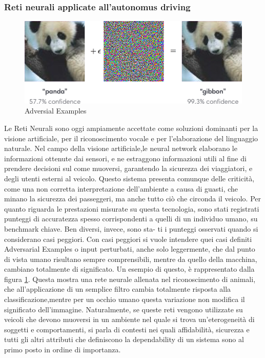 \documentclass[14pt]{extarticle}
\begin{document}
\subsubsection{Reti neurali applicate all'autonomus driving}
\begin{figure}
	\centering
	\includegraphics[scale=0.8]{adversarial_img.png}
	\caption{Adversial Examples}
	\label{fig:AdvExp}
	\end{figure}
Le Reti Neurali sono oggi ampiamente accettate come soluzioni dominanti per la visione artificiale, per il riconoscimento vocale e per l'elaborazione del linguaggio naturale. Nel campo della visione artificiale,le neural network elaborano le informazioni ottenute dai sensori, e ne estraggono informazioni utili al fine di prendere decisioni sul come muoversi, garantendo la sicurezza dei viaggiatori, e degli utenti esterni al veicolo. 
Questo sistema presenta comunque delle criticità, come una non corretta interpretazione dell'ambiente a causa di guasti, che minano la sicurezza dei passeggeri, ma anche tutto ciò che circonda il veicolo.%
Per quanto riguarda le prestazioni misurate su questa tecnologia, sono stati
registrati punteggi di accuratezza spesso corrispondenti a quelli di un
individuo umano, su benchmark chiave. Ben diversi, invece, sono sta-
ti i punteggi osservati quando si considerano  casi peggiori\cite{secci2020failures}. Con casi
peggiori si vuole intendere quei casi definiti Adversarial Examples \cite{engstrom2019exploring} o
input perturbati, anche solo leggermente, che dal punto di vista umano
risultano sempre comprensibili, mentre da quello della macchina, cambiano totalmente di significato. Un esempio di questo, è rappresentato dalla figura \ref{fig:AdvExp}. Questa mostra una rete neurale allenata nel riconoscimento di animali, che all'applicazione di un semplice filtro cambia totalmente risposta alla classificazione,mentre per un occhio umano questa variazione non modifica il significato dell'immagine.
Naturalmente, se queste reti vengono
utilizzate su veicoli che devono muoversi in un ambiente nel quale si
trova un'eterogeneità di soggetti e comportamenti, si parla di contesti
nei quali affidabilità, sicurezza e tutti gli altri attributi che definiscono la
dependability di un sistema sono al primo posto in ordine di importanza.
\end{document}
